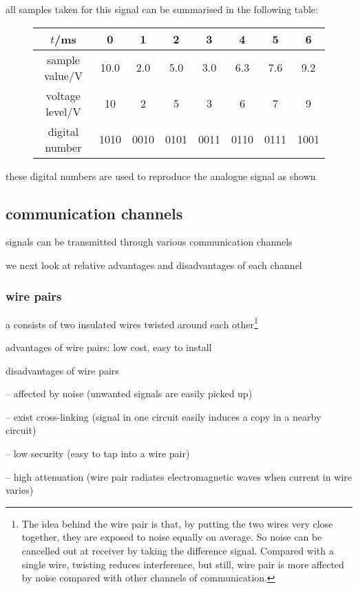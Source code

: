 all samples taken for this signal can be summarised in the following table:

\begin{figure}[ht]
	\centering
	\begin{tabular}{|c|c|c|c|c|c|c|c|}
		\hline
		$t$/ms & 0 & 1 & 2 & 3 & 4 & 5 & 6 \\ \hline
		sample value/V & 10.0 & 2.0 & 5.0 & 3.0 & 6.3 & 7.6 & 9.2 \\ \hline
		voltage level/V & 10 & 2 & 5 & 3 & 6 & 7 & 9 \\ \hline
		digital number & 1010 & 0010 & 0101 & 0011 & 0110 & 0111 & 1001 \\ \hline
	\end{tabular}
	\vspace*{-10pt}
\end{figure}

these digital numbers are used to reproduce the analogue signal as shown \eoe






\subsection{communication channels}

signals can be transmitted through various communication channels

we next look at relative advantages and disadvantages of each channel

\subsubsection{wire pairs}

a  consists of two insulated wires twisted around each other\footnote{The idea behind the wire pair is that, by putting the two wires very close together, they are exposed to noise equally on average. So noise can be cancelled out at receiver by taking the difference signal. Compared with a single wire, twisting reduces interference, but still, wire pair is more affected by noise compared with other channels of communication.}

\cmt advantages of wire pairs: low cost, easy to install

\cmt disadvantages of wire pairs

\begin{compactitem}
	\item[--] affected by noise (unwanted signals are easily picked up)
	
	\item[--] exist cross-linking (signal in one circuit easily induces a copy in a nearby circuit)
	
	\item[--] low security (easy to tap into a wire pair)
	
	\item[--] high attenuation (wire pair radiates electromagnetic waves when current in wire varies)
\end{compactitem}

